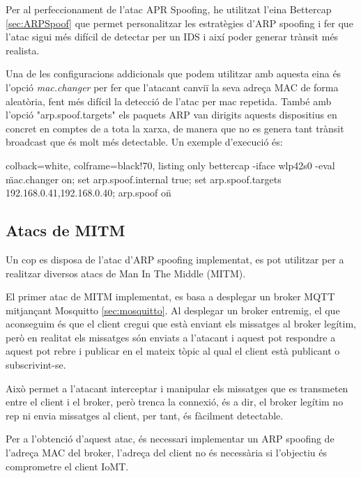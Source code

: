 Per al perfeccionament de l'atac APR Spoofing, he utilitzat l'eina Bettercap \ref{sec:ARPSpoof} que permet personalitzar les estratègies d'ARP spoofing i fer que l'atac sigui més difícil de detectar per un IDS i així poder generar trànsit més realista. 

Una de les configuracions addicionals que podem utilitzar amb aquesta eina és l'opció \textit{mac.changer} per fer que l'atacant canviï la seva adreça MAC de forma aleatòria, fent més difícil la detecció de l'atac per mac repetida. També amb l'opció "arp.spoof.targets" els paquets ARP van dirigits aquests dispositius en concret en comptes de a tota la xarxa, de manera que no es genera tant trànsit broadcast que és molt més detectable. Un exemple d'execució és:

\begin{tcblisting}{colback=white, colframe=black!70, listing only}
bettercap -iface wlp42s0 -eval \"mac.changer on; set arp.spoof.internal true; set arp.spoof.targets 192.168.0.41,192.168.0.40; arp.spoof on\" 
\end{tcblisting}

\subsection{Atacs de MITM}
\label{sec:MITM}
Un cop es disposa de l'atac d'ARP spoofing implementat, es pot utilitzar per a realitzar diversos atacs de Man In The Middle (MITM). 

El primer atac de MITM implementat, es basa a desplegar un broker MQTT mitjançant Mosquitto \ref{sec:mosquitto}. Al desplegar un broker entremig, el que aconseguim és que el client cregui que està enviant els missatges al broker legítim, però en realitat els missatges són enviats a l'atacant i aquest pot respondre a aquest pot rebre i publicar en el mateix tòpic al qual el client està publicant o subscrivint-se.

Això permet a l'atacant interceptar i manipular els missatges que es transmeten entre el client i el broker, però trenca la connexió, és a dir, el broker legítim no rep ni envia missatges al client, per tant, és fàcilment detectable.

Per a l'obtenció d'aquest atac, és necessari implementar un ARP spoofing de l'adreça MAC del broker, l'adreça del client no és necessària si l'objectiu és comprometre el client IoMT. 

